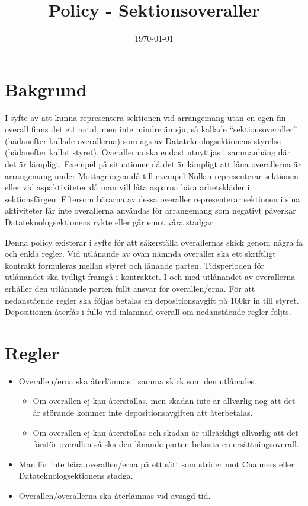 \documentclass{dtek}
\title{Policy - Sektionsoveraller}
\date{\today} %
\begin{document}
\makeheadfoot
\maketitle

\section{Bakgrund}
I syfte av att kunna representera sektionen vid arrangemang utan en egen fin overall finns det ett antal, men inte mindre än sju, så kallade ``sektionsoveraller'' (hädanefter kallade overallerna) som ägs av Datateknologsektionens styrelse (hädanefter kallat styret). Overallerna ska endast utnyttjas i sammanhäng där det är lämpligt.
Exempel på situationer då det är lämpligt att låna overallerna är arrangemang under Mottagningen då till exempel Nollan representerar sektionen eller vid aspaktiviteter då man vill låta asparna bära arbetskläder i sektionsfärgen.
Eftersom bärarna av dessa overaller representerar sektionen i sina aktiviteter får inte overallerna användas för arrangemang som negativt påverkar Datateknologsektionens rykte eller går emot våra stadgar.

Denna policy existerar i syfte för att säkerställa overallernas skick genom några få och enkla regler.
Vid utlånande av ovan nämnda overaller ska ett skriftligt kontrakt formuleras mellan styret och lånande parten. Tidsperioden för utlånandet ska tydligt framgå i kontraktet. I och med utlånandet av overallerna erhåller den utlånande parten fullt ansvar för overallen/erna. För att nedanstående regler ska följas betalas en depositionsavgift på 100kr in till styret. Depositionen återfås i fullo vid inlämnad overall om nedanstående regler följts.

\section{Regler}
\begin{itemize}
\item Overallen/erna ska återlämnas i samma skick som den utlånades.
  \begin{itemize}
  \item Om overallen ej kan återställas, men skadan inte är allvarlig nog att det är störande kommer inte depositionsavgiften att återbetalas.
  \item Om overallen ej kan återställas och skadan är tillräckligt allvarlig att det förstör overallen så ska den lånande parten bekosta en ersättningsoverall.
  \end{itemize}
\item Man får inte bära overallen/erna på ett sätt som strider mot Chalmers eller Datateknologsektionens stadga.
\item Overallen/overallerna ska återlämnas vid avsagd tid.
\end{itemize}
\end{document}

